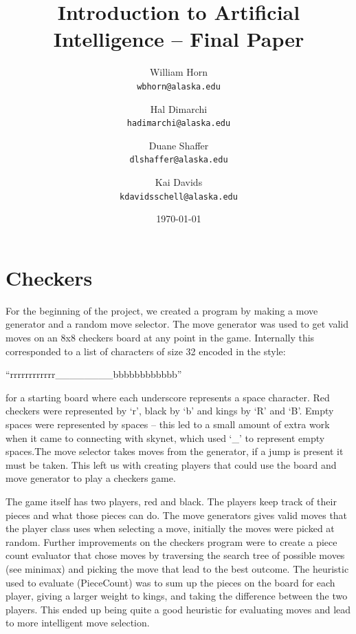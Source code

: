 \documentclass{article}
\begin{document}
\title{\textbf{Introduction to Artificial Intelligence -- Final Paper}}

\author{
  William Horn\\
  \texttt{wbhorn@alaska.edu}
  \and
  Hal Dimarchi\\
  \texttt{hadimarchi@alaska.edu}
  \and
  Duane Shaffer\\
  \texttt{dlshaffer@alaska.edu}
  \and
  Kai Davids\\
  \texttt{kdavidsschell@alaska.edu}
}
\date{\today}
\maketitle

\section{Checkers}

For the beginning of the project, we created a program by making a move generator and a random move selector. The move generator was used to get valid moves on an 8x8 checkers board at any point in the game. Internally this corresponded to a list of characters of size 32 encoded in the style:
\begin{displayquote}
``rrrrrrrrrrrr\_\_\_\_\_\_\_\_bbbbbbbbbbbb''
\end{displayquote}
for a starting board where each underscore represents a space character. Red checkers were represented by `r', black by `b' and kings by `R' and `B'. Empty spaces were represented by spaces -- this led to a small amount of extra work when it came to connecting with skynet, which used `\_' to represent empty spaces.The move selector takes moves from the generator, if a jump is present it must be taken. This left us with creating players that could use the board and move generator to play a checkers game.

The game itself has two players, red and black. The players keep track of their pieces and what
those pieces can do. The move generators gives valid moves that
the player class uses when selecting a move, initially the moves were picked at
random. Further improvements on the checkers program were to create a piece
count evaluator that chose moves by traversing the search tree of possible
moves (see minimax) and picking the move that lead to the best outcome. The
heuristic used to evaluate (PieceCount) was to sum up the pieces on the board for each
player, giving a larger weight to kings, and taking the difference between the
two players. This ended up being quite a good heuristic for evaluating moves
and lead to more intelligent move selection.
\end{document}
